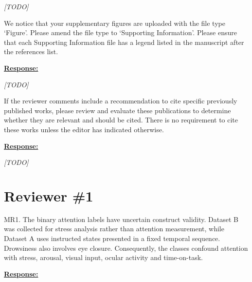 \documentclass{article}
\begin{document}
\emph{[TODO]}

\vspace{0.3cm}


\begin{cmt}{}{}

We notice that your supplementary figures are uploaded with the file type
`Figure'. Please amend the file type to `Supporting Information'. Please ensure
that each Supporting Information file has a legend listed in the manuscript
after the references list.

\end{cmt}
\vspace{0.1cm}
\noindent
\underline{\textbf{Response:}}
\vspace{0.2cm}

\emph{[TODO]}

\vspace{0.3cm}


\begin{cmt}{}{}

If the reviewer comments include a recommendation to cite specific previously
published works, please review and evaluate these publications to determine
whether they are relevant and should be cited. There is no requirement to cite
these works unless the editor has indicated otherwise.

\end{cmt}
\vspace{0.1cm}
\noindent
\underline{\textbf{Response:}}
\vspace{0.2cm}

\emph{[TODO]}

\vspace{0.3cm}


\newpage
\setcounter{tcb@cnt@cmt}{0}
\section*{Reviewer \#1}

\vspace{0.4cm}

\begin{cmt}{}{}

MR1. The binary attention labels have uncertain construct validity. Dataset B
was collected for stress analysis rather than attention measurement, while
Dataset A uses instructed states presented in a fixed temporal sequence.
Drowsiness also involves eye closure. Consequently, the classes confound
attention with stress, arousal, visual input, ocular activity and time-on-task.

\end{cmt}
\vspace{0.1cm}
\noindent
\underline{\textbf{Response:}}
\vspace{0.2cm}
\end{document}
